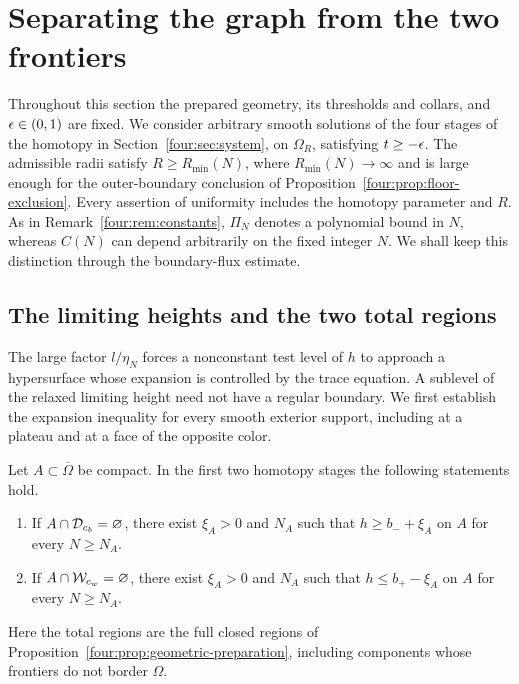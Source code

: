 \section{Separating the graph from the two frontiers}\label{four:sec:bounds}

Throughout this section the prepared geometry, its thresholds and collars,
and $\epsilon\in(0,1)$ are fixed.  We consider arbitrary smooth solutions of
the four stages of the homotopy in Section~\ref{four:sec:system}, on
$\Omega_R$, satisfying $t\ge-\epsilon$.  The admissible radii satisfy
$R\ge R_{\min}(N)$, where $R_{\min}(N)\to\infty$ and is large enough for
the outer-boundary conclusion of Proposition~\ref{four:prop:floor-exclusion}.
Every assertion of uniformity includes the homotopy parameter and $R$.
As in Remark~\ref{four:rem:constants}, $\Pi_N$ denotes a polynomial bound in
$N$, whereas $C(N)$ can depend arbitrarily on the fixed integer $N$.
We shall keep this distinction through the boundary-flux estimate.

\subsection{The limiting heights and the two total regions}

The large factor $l/\eta_N$ forces a nonconstant test level of $h$ to
approach a hypersurface whose expansion is controlled by the trace
equation.  A sublevel of the relaxed limiting height need not have a
regular boundary.  We first establish the expansion inequality for
every smooth exterior support, including at a plateau and at a face
of the opposite color.

\begin{proposition}
\label{four:prop:height-exclusion}
Let $A\subset\overline\Omega$ be compact.  In the first two homotopy
stages the following statements hold.
\begin{enumerate}[label=\textup{(\roman*)}]
\item If $A\cap\mathcal D_{c_b}=\varnothing$, there exist $\xi_A>0$ and
$N_A$ such that $h\ge b_-+\xi_A$ on $A$ for every $N\ge N_A$.
\item If $A\cap\mathcal W_{c_w}=\varnothing$, there exist $\xi_A>0$ and
$N_A$ such that $h\le b_+-\xi_A$ on $A$ for every $N\ge N_A$.
\end{enumerate}
Here the total regions are the full closed regions of
Proposition~\ref{four:prop:geometric-preparation}, including components whose
frontiers do not border $\Omega$.
\end{proposition}

